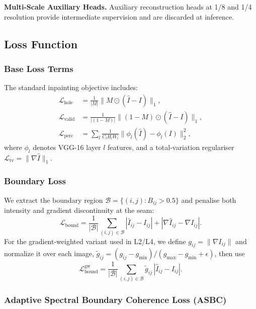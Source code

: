 \documentclass[10pt,conference]{IEEEtran}
\newcommand{\Lhole}{\mathcal{L}_{\mathrm{hole}}}
\newcommand{\Lvalid}{\mathcal{L}_{\mathrm{valid}}}
\newcommand{\Lbound}{\mathcal{L}_{\mathrm{bound}}}
\newcommand{\Lperc}{\mathcal{L}_{\mathrm{perc}}}
\newcommand{\Ltv}{\mathcal{L}_{\mathrm{tv}}}
\begin{document}
\textbf{Multi-Scale Auxiliary Heads.}
Auxiliary reconstruction heads at 1/8 and 1/4 resolution provide intermediate
supervision and are discarded at inference.

\subsection{Loss Function}
\label{sec:loss}

\subsubsection{Base Loss Terms}
The standard inpainting objective includes:
\begin{align}
  \Lhole  &= \frac{1}{|M|}\|M \odot (\hat{I}-I)\|_1, \label{eq:lhole}\\
  \Lvalid &= \frac{1}{|(1{-}M)|}\|(1{-}M) \odot (\hat{I}-I)\|_1,\\
  \Lperc  &= \sum_{l}\frac{1}{C_l H_l W_l}\|\phi_l(\hat{I})-\phi_l(I)\|_2^2,
  \label{eq:lperc}
\end{align}
where $\phi_l$ denotes VGG-16 layer $l$ features, and a total-variation
regulariser $\Ltv = \|\nabla \hat{I}\|_1$.

\subsubsection{Boundary Loss}
We extract the boundary region $\mathcal{B} = \{(i,j): B_{ij} > 0.5\}$ and
penalise both intensity and gradient discontinuity at the seam:
\begin{equation}
  \Lbound = \frac{1}{|\mathcal{B}|}\sum_{(i,j)\in\mathcal{B}}
    \!\left|\hat{I}_{ij}-I_{ij}\right|
    + \left|\nabla\hat{I}_{ij}-\nabla I_{ij}\right|.
  \label{eq:lbound}
\end{equation}
For the gradient-weighted variant used in L2/L4, we define
$g_{ij}=\|\nabla I_{ij}\|$ and normalize it over each image,
$\tilde{g}_{ij}=(g_{ij}-g_{\min})/(g_{\max}-g_{\min}+\epsilon)$, then use
\begin{equation}
  \Lbound^{\mathrm{gw}} = \frac{1}{|\mathcal{B}|}\sum_{(i,j)\in\mathcal{B}}
    \tilde{g}_{ij}\,\left|\hat{I}_{ij}-I_{ij}\right|.
  \label{eq:lbound_gw}
\end{equation}

\subsubsection{Adaptive Spectral Boundary Coherence Loss (ASBC)}
\label{sec:asbc}
\end{document}
